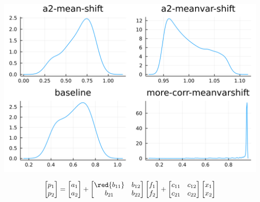 \documentclass[
  ignorenonframetext,
]{beamer}
\begin{document}
\begin{frame}{}
\protect\hypertarget{section-6}{}
\begin{center}\includegraphics[width=0.95\paperheight]{complexity_files/figure-beamer/unnamed-chunk-27-1} \end{center}

\[
\begin{bmatrix}
 p_1 \\ p_2
\end{bmatrix} =
\begin{bmatrix}
 a_1 \\ {a_2}
\end{bmatrix}
 + 
 \begin{bmatrix}
 \red{b_{11}} & b_{12} \\
 b_{21} & b_{22}
\end{bmatrix}
\begin{bmatrix}
 f_1 \\ f_2
\end{bmatrix}
+
 \begin{bmatrix}
 c_{11} & c_{12} \\
 c_{21} & c_{22}
\end{bmatrix}
\begin{bmatrix}
 x_1 \\ x_2
\end{bmatrix}
\]
\end{frame}
\end{document}
